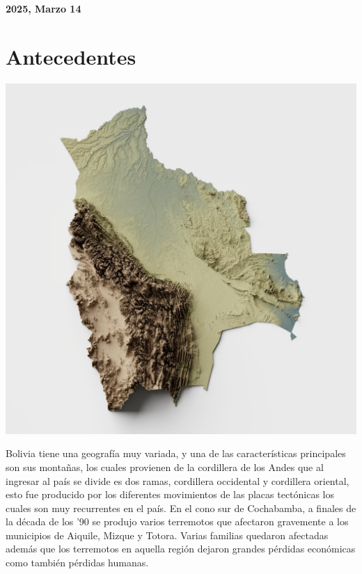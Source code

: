 \documentclass[12pt]{article}
\begin{document}
\begin{center}
    \large \bf 2025, Marzo 14
\end{center}

\thispagestyle{empty}

\setcounter{page}{0}

\newpage

\tableofcontents 

\newpage

\section{Antecedentes}


\begin{center}
  \includegraphics[width=15cm]{bolivian_map}
\end{center}

Bolivia tiene una geografía muy variada, y una de las características principales son sus montañas, los cuales provienen de la cordillera de los Andes que al ingresar al país se divide es dos ramas, cordillera occidental y cordillera oriental, esto fue producido por los diferentes movimientos de las placas tectónicas los cuales son muy recurrentes en el país.
En el cono sur de Cochabamba, a finales de la década de los ’90 se produjo varios terremotos que afectaron gravemente a los municipios de Aiquile, Mizque y Totora. Varias familias quedaron afectadas además que los terremotos en aquella región dejaron grandes pérdidas económicas como también pérdidas humanas.
\\
\end{document}
